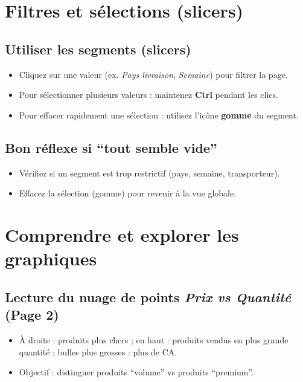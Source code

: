 \documentclass[a4paper,12pt]{article}
\begin{document}
\section{Filtres et sélections (slicers)}

\subsection{Utiliser les segments (slicers)}
\begin{itemize}[leftmargin=*]
  \item Cliquez sur une valeur (ex. \textit{Pays livraison}, \textit{Semaine}) pour filtrer la page.
  \item Pour sélectionner plusieurs valeurs : maintenez \textbf{Ctrl} pendant les clics.
  \item Pour effacer rapidement une sélection : utilisez l’icône \textbf{gomme} du segment.
\end{itemize}

\subsection{Bon réflexe si ``tout semble vide''}
\begin{itemize}[leftmargin=*]
  \item Vérifiez si un segment est trop restrictif (pays, semaine, transporteur).
  \item Effacez la sélection (gomme) pour revenir à la vue globale.
\end{itemize}

\section{Comprendre et explorer les graphiques}
\subsection{Lecture du nuage de points \textit{Prix vs Quantité} (Page 2)}
\begin{itemize}[leftmargin=*]
  \item À droite : produits plus chers ; en haut : produits vendus en plus grande quantité ; bulles plus grosses : plus de CA.
  \item Objectif : distinguer produits ``volume'' vs produits ``premium''.
\end{itemize}
\end{document}

